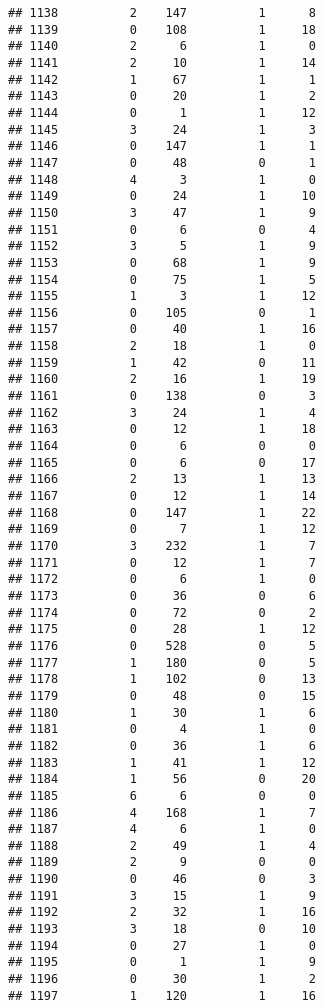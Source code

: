 \documentclass[]{article}
\begin{document}
\begin{verbatim}
## 1138          2    147          1      8
## 1139          0    108          1     18
## 1140          2      6          1      0
## 1141          2     10          1     14
## 1142          1     67          1      1
## 1143          0     20          1      2
## 1144          0      1          1     12
## 1145          3     24          1      3
## 1146          0    147          1      1
## 1147          0     48          0      1
## 1148          4      3          1      0
## 1149          0     24          1     10
## 1150          3     47          1      9
## 1151          0      6          0      4
## 1152          3      5          1      9
## 1153          0     68          1      9
## 1154          0     75          1      5
## 1155          1      3          1     12
## 1156          0    105          0      1
## 1157          0     40          1     16
## 1158          2     18          1      0
## 1159          1     42          0     11
## 1160          2     16          1     19
## 1161          0    138          0      3
## 1162          3     24          1      4
## 1163          0     12          1     18
## 1164          0      6          0      0
## 1165          0      6          0     17
## 1166          2     13          1     13
## 1167          0     12          1     14
## 1168          0    147          1     22
## 1169          0      7          1     12
## 1170          3    232          1      7
## 1171          0     12          1      7
## 1172          0      6          1      0
## 1173          0     36          0      6
## 1174          0     72          0      2
## 1175          0     28          1     12
## 1176          0    528          0      5
## 1177          1    180          0      5
## 1178          1    102          0     13
## 1179          0     48          0     15
## 1180          1     30          1      6
## 1181          0      4          1      0
## 1182          0     36          1      6
## 1183          1     41          1     12
## 1184          1     56          0     20
## 1185          6      6          0      0
## 1186          4    168          1      7
## 1187          4      6          1      0
## 1188          2     49          1      4
## 1189          2      9          0      0
## 1190          0     46          0      3
## 1191          3     15          1      9
## 1192          2     32          1     16
## 1193          3     18          0     10
## 1194          0     27          1      0
## 1195          0      1          1      9
## 1196          0     30          1      2
## 1197          1    120          1     16

\end{verbatim}
\end{document}

